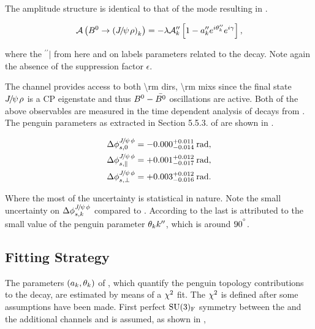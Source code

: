 \noindent The amplitude structure is identical to that of the \BsJpsiKst mode resulting in .

\begin{equation}
  \mathcal{A} \left( B^0\rightarrow \left({J\mskip -3mu/\mskip -2mu\psi\mskip 2mu} \rho\right)_{k} \right) = -\lambda \mathcal{A}_{k}'' \left[  1 - a_k'' e^{i\theta_k''} e^{i\gamma}  \right],
  \label{bsjpsirho_amp}
\end{equation}

\noindent where the ${}^{\prime\prime}|$ from here and on labels parameters related to the \BdJpsiRho decay.
Note again the absence of the suppression factor $\epsilon$.

The \BdJpsiRho channel provides access to both \Acp{\rm dir}, \Acp{\rm mix} since the final state ${J\mskip -3mu/\mskip -2mu\psi\mskip 2mu}\rho$ is
a CP eigenstate and thus $B^0-\bar{B^0}$ oscillations are active. Both of the above observables are measured in the
time dependent analysis of \BdJpsipipi decays from \lhcb\cite{Aaij:2014vda}. The penguin parameters as extracted
in Section 5.5.3. of \cite{DeBruyn-thesis} are shown in .

\begin{subequations}
  \label{delta_phis_jpsirho}
  \begin{align}
    \Delta\phi^{{J\mskip -3mu/\mskip -2mu\psi\mskip 2mu}\phi}_{s,{0}}         & = -0.000^{+0.011}_{-0.014}\:\text{rad},\\
    \Delta\phi^{{J\mskip -3mu/\mskip -2mu\psi\mskip 2mu}\phi}_{s,{\parallel}} & = +0.001^{+0.012}_{-0.017}\:\text{rad},\\
    \Delta\phi^{{J\mskip -3mu/\mskip -2mu\psi\mskip 2mu}\phi}_{s,{\perp}}     & = +0.003^{+0.012}_{-0.016}\:\text{rad}.
  \end{align}
\end{subequations}

\noindent Where the most of the uncertainty is statistical in nature. Note the small uncertainty on
$\Delta\phi^{{J\mskip -3mu/\mskip -2mu\psi\mskip 2mu}\phi}_{s,{k}}$ compared to . According to\cite{DeBruyn-thesis} the last is attributed
to the small value of the penguin parameter $\theta_k{k}''$, which is around $90^{^{\circ}}$.

\subsection{Fitting Strategy}
\label{penguin_chi2_fit}

The parameters $(a_k,\theta_k)$ of , which quantify the penguin topology contributions
to the \BsJpsiPhi decay, are estimated by means of a $\chi^2$ fit. The $\chi^2$ is defined after some assumptions have
been made. First perfect $\mathrm{SU}(3)_{\rm F}$ symmetry between the \BsJpsiPhi and the additional channels \BsJpsiKst
and \BdJpsiRho is assumed, as shown in ,

